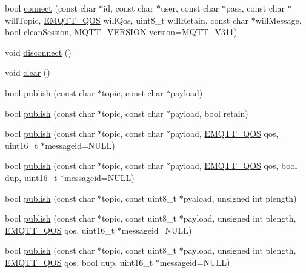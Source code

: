 \begin{DoxyCompactItemize}
\item 
bool \hyperlink{class_m_q_t_t_aa880316318b5bdc133c2f8c6bba1e253}{connect} (const char $\ast$id, const char $\ast$user, const char $\ast$pass, const char $\ast$will\+Topic, \hyperlink{class_m_q_t_t_aff501e08e20ebf26b3272fcc0e7215ff}{E\+M\+Q\+T\+T\+\_\+\+Q\+OS} will\+Qos, uint8\+\_\+t will\+Retain, const char $\ast$will\+Message, bool clean\+Session, \hyperlink{class_m_q_t_t_a49430c9d6f68bbdc4e1bd039a6f5f97e}{M\+Q\+T\+T\+\_\+\+V\+E\+R\+S\+I\+ON} version=\hyperlink{class_m_q_t_t_a49430c9d6f68bbdc4e1bd039a6f5f97eae61f66bbb0b315cf4cb7636684c68602}{M\+Q\+T\+T\+\_\+\+V311})
\item 
void \hyperlink{class_m_q_t_t_a7d49b425517408d227836c10169f8df8}{disconnect} ()
\item 
void \hyperlink{class_m_q_t_t_a510932d1c5fb0c918debcf60cfc267e1}{clear} ()
\item 
bool \hyperlink{class_m_q_t_t_a0a335a0e6c60ea0e256f76a1969a5137}{publish} (const char $\ast$topic, const char $\ast$payload)
\item 
bool \hyperlink{class_m_q_t_t_a802136b5419b3a694ea88be27bdb9043}{publish} (const char $\ast$topic, const char $\ast$payload, bool retain)
\item 
bool \hyperlink{class_m_q_t_t_ae9321f0f8b365eaf32c87706273cb473}{publish} (const char $\ast$topic, const char $\ast$payload, \hyperlink{class_m_q_t_t_aff501e08e20ebf26b3272fcc0e7215ff}{E\+M\+Q\+T\+T\+\_\+\+Q\+OS} qos, uint16\+\_\+t $\ast$messageid=N\+U\+LL)
\item 
bool \hyperlink{class_m_q_t_t_abd5a453777652cd30ae3cfc4df4aa376}{publish} (const char $\ast$topic, const char $\ast$payload, \hyperlink{class_m_q_t_t_aff501e08e20ebf26b3272fcc0e7215ff}{E\+M\+Q\+T\+T\+\_\+\+Q\+OS} qos, bool dup, uint16\+\_\+t $\ast$messageid=N\+U\+LL)
\item 
bool \hyperlink{class_m_q_t_t_a6a5dd9b7c19f2892802a222ec5d610b5}{publish} (const char $\ast$topic, const uint8\+\_\+t $\ast$pyaload, unsigned int plength)
\item 
bool \hyperlink{class_m_q_t_t_ae9ea303a55434b8a6bba3147938aa9a9}{publish} (const char $\ast$topic, const uint8\+\_\+t $\ast$payload, unsigned int plength, \hyperlink{class_m_q_t_t_aff501e08e20ebf26b3272fcc0e7215ff}{E\+M\+Q\+T\+T\+\_\+\+Q\+OS} qos, uint16\+\_\+t $\ast$messageid=N\+U\+LL)
\item 
bool \hyperlink{class_m_q_t_t_a5e7738081e77b6c381f71737e8841869}{publish} (const char $\ast$topic, const uint8\+\_\+t $\ast$payload, unsigned int plength, \hyperlink{class_m_q_t_t_aff501e08e20ebf26b3272fcc0e7215ff}{E\+M\+Q\+T\+T\+\_\+\+Q\+OS} qos, bool dup, uint16\+\_\+t $\ast$messageid=N\+U\+LL)

\end{DoxyCompactItemize}
